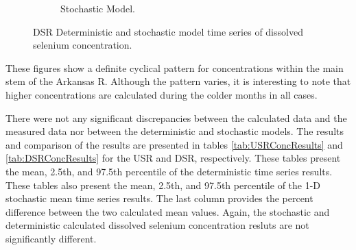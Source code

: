 \begin{linenumbers}
\begin{landscape}
\begin{figure}
\begin{subfigure}{0.7\textwidth}
			\caption{Stochastic Model.}
		\end{subfigure}
		\caption{DSR Deterministic and stochastic model time series of dissolved selenium concentration.}
	\end{figure}
\end{landscape}
\subfiguretop

These figures show a definite cyclical pattern for concentrations within the main stem of the Arkansas R.  Although the pattern varies, it is interesting to note that higher concentrations are calculated during the colder months in all cases.

There were not any significant discrepancies between the calculated data and the measured data nor between the deterministic and stochastic models.  The results and comparison of the results are presented in tables \ref{tab:USRConcResults} and \ref{tab:DSRConcResults} for the USR and DSR, respectively.  These tables present the mean, 2.5th, and 97.5th percentile of the deterministic time series results.  These tables also present the mean, 2.5th, and 97.5th percentile of the 1-D stochastic mean time series results.  The last column provides the percent difference between the two calculated mean values.  Again, the stochastic and deterministic calculated dissolved selenium concentration resluts are not significantly different.

\subtabletop
\begin{table}[htbp]
	\centering
  \caption[USR dissolved selenium concentration results table.]{USR dissolved selenium concentration results table.  Values are in units of \si{\micro\gram\per\liter}.}
	\label{tab:USRConcResults}
	\begin{subtable}{\textwidth}
		\centering
		
	\end{subtable}\\
	\tablevspace
	\begin{subtable}{\textwidth}
		\centering
		
	\end{subtable}\\
\end{table}

\subtablemid
\begin{table}[htbp]
	\centering
	\caption{USR dissolved selenium concentration results table.}
	\begin{subtable}{\textwidth}
		\centering
		
	\end{subtable}\\
	\tablevspace
	\begin{subtable}{\textwidth}
		\centering
		
	\end{subtable}\\
\end{table}


\end{linenumbers}
